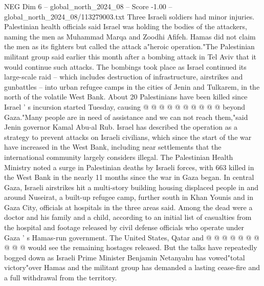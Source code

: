 \begin{textsample}{NEG Dim 6 – global\_north\_2024\_08 – Score -1.00 – global\_north\_2024\_08/113279003.txt}
Three Israeli soldiers had minor injuries.
Palestinian health officials said Israel was holding the bodies of the attackers, naming the men as Muhammad Marqa and Zoodhi Afifeh.
Hamas did not claim the men as its fighters but called the attack a"heroic operation."The Palestinian militant group said earlier this month after a bombing attack in Tel Aviv that it would continue such attacks.
The bombings took place as Israel continued its large-scale raid -- which includes destruction of infrastructure, airstrikes and gunbattles -- into urban refugee camps in the cities of Jenin and Tulkarem, in the north of the volatile West Bank.
About 20 Palestinians have been killed since Israel ' s incursion started Tuesday, causing @ @ @ @ @ @ @ @ @ @ beyond Gaza."Many people are in need of assistance and we can not reach them,"said Jenin governor Kamal Abu-al Rub.
Israel has described the operation as a strategy to prevent attacks on Israeli civilians, which since the start of the war have increased in the West Bank, including near settlements that the international community largely considers illegal.
The Palestinian Health Ministry noted a surge in Palestinian deaths by Israeli forces, with 663 killed in the West Bank in the nearly 11 months since the war in Gaza began.
In central Gaza, Israeli airstrikes hit a multi-story building housing displaced people in and around Nuseirat, a built-up refugee camp, further south in Khan Younis and in Gaza City, officials at hospitals in the three areas said.
Among the dead were a doctor and his family and a child, according to an initial list of casualties from the hospital and footage released by civil defense officials who operate under Gaza ' s Hamas-run government.
The United States, Qatar and @ @ @ @ @ @ @ @ @ @ would see the remaining hostages released.
But the talks have repeatedly bogged down as Israeli Prime Minister Benjamin Netanyahu has vowed"total victory"over Hamas and the militant group has demanded a lasting cease-fire and a full withdrawal from the territory.

\end{textsample}
